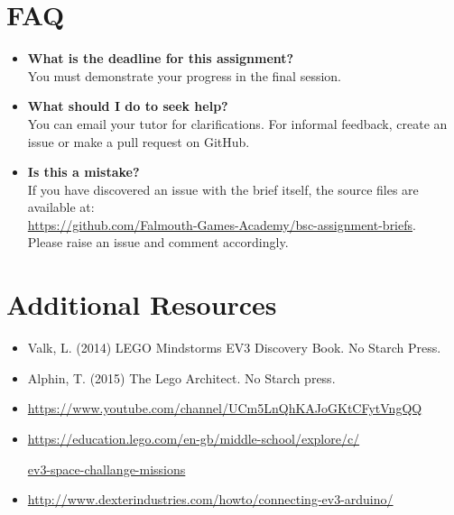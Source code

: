 \documentclass{fal_assignment}
\begin{document}
\section*{FAQ}

\begin{itemize}
	\item 	\textbf{What is the deadline for this assignment?} \\ 
    		You must demonstrate your progress in the final session.
    		
	\item 	\textbf{What should I do to seek help?} \\ 
    		You can email your tutor for clarifications. For informal feedback, create an issue or make a pull request on GitHub. 
    		
    	\item 	\textbf{Is this a mistake?} \\ 	
    		If you have discovered an issue with the brief itself, the source files are available at: \\
    		\url{https://github.com/Falmouth-Games-Academy/bsc-assignment-briefs}.\\
    		 Please raise an issue and comment accordingly.
\end{itemize}

\section*{Additional Resources}

\begin{itemize}
    \item Valk, L. (2014) LEGO Mindstorms EV3 Discovery Book. No Starch Press.
    \item Alphin, T. (2015) The Lego Architect. No Starch press.
    \item \url{https://www.youtube.com/channel/UCm5LnQhKAJoGKtCFytVngQQ}
    \item \url{https://education.lego.com/en-gb/middle-school/explore/c/}\par \url{ev3-space-challange-missions}
    \item \url{http://www.dexterindustries.com/howto/connecting-ev3-arduino/}
\end{itemize}
\end{document}
